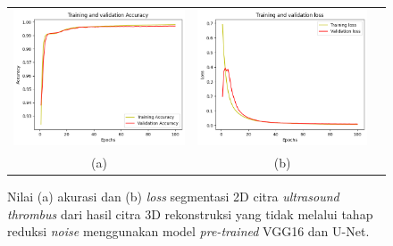 \begin{enumerate}
	
	\begin{figure}[htbp]
		\centering
		\begin{tabular}{ccc}
			\includegraphics[scale=0.5]{bab4/Rekap Training/VGG16-UNet/Ori/5/acc_99,71024990081787.png} &
			\includegraphics[scale=0.5]{bab4/Rekap Training/VGG16-UNet/Ori/5/loss_0,0089.png} & \\
			(a) & (b)    %
		\end{tabular}
		\caption{Nilai (a) akurasi dan (b) \textit{loss} segmentasi 2D citra \textit{ultrasound} \textit{thrombus} dari hasil citra 3D rekonstruksi yang tidak melalui tahap reduksi \textit{noise} menggunakan model \textit{pre-trained} VGG16 dan U-Net.}
		\label{fig:performance-ori-vggunet-rekonstruksi}
	\end{figure}
	

\end{enumerate}
